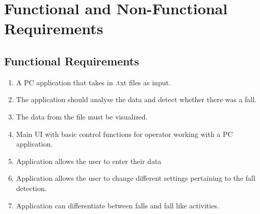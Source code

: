 \documentclass[hidelinks,conference,12pt]{IEEETran}
\begin{document}
\section{Functional and Non-Functional Requirements}
\subsection{Functional Requirements}
\begin{enumerate}
	\item A PC application that takes in .txt files as input.
	\item The application should analyse the data and detect whether there was a fall.
	\item The data from the file must be visualized.
	\item Main UI with basic control functions for operator working with a PC application.
	\item Application allows the user to enter their data
	\item Application allows the user to change different settings pertaining to the fall detection.
	\item Application can differentiate between falls and fall like activities.
\end{enumerate}
\end{document}
